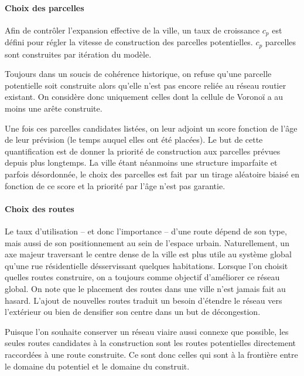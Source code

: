 \documentclass[12pt]{article}
\begin{document}
\paragraph{Choix des parcelles\\}

Afin de contrôler l'expansion effective de la ville, un taux de
croissance $c_p$ est défini pour régler la vitesse de construction des
parcelles potentielles. $c_p$ parcelles sont construites par itération
du modèle.

Toujours dans un soucis de cohérence historique, on refuse qu'une
parcelle potentielle soit construite alors qu'elle n'est pas encore
reliée au réseau routier existant. On considère donc uniquement celles
dont la cellule de Voronoï a au moins une arête construite.

Une fois ces parcelles candidates listées, on leur adjoint un score
fonction de l'âge de leur prévision (le temps auquel elles ont été
placées). Le but de cette quantification est de donner la priorité de
construction aux parcelles prévues depuis plus longtemps. La ville
étant néanmoins une structure imparfaite et parfois désordonnée, le
choix des parcelles est fait par un tirage aléatoire biaisé en
fonction de ce score et la priorité par l'âge n'est pas garantie.

\paragraph{Choix des routes\\}

Le taux d'utilisation -- et donc l'importance -- d'une route dépend de
son type, mais aussi de son positionnement au sein de l'espace
urbain. Naturellement, un axe majeur traversant le centre dense de la
ville est plus utile au système global qu'une rue résidentielle
désservissant quelques habitations. Lorsque l'on choisit quelles
routes construire, on a toujours comme objectif d'améliorer ce réseau
global. On note que le placement des routes dans une ville n'est
jamais fait au hasard. L'ajout de nouvelles routes traduit un besoin
d'étendre le réseau vers l'extérieur ou bien de densifier son centre
dans un but de décongestion.

Puisque l'on souhaite conserver un réseau viaire aussi connexe que
possible, les seules routes candidates à la construction sont les
routes potentielles directement raccordées à une route construite. Ce
sont donc celles qui sont à la frontière entre le domaine du potentiel
et le domaine du construit.
\end{document}
